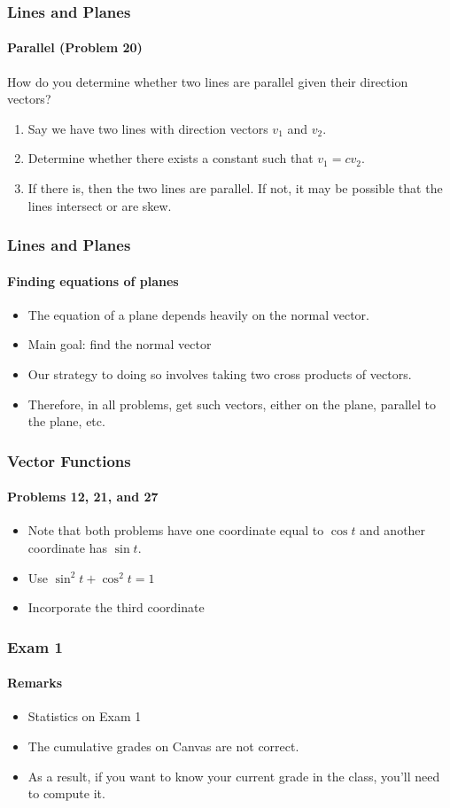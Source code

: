 \documentclass[xcolor=svgnames]{beamer}
\begin{document}
\begin{frame}
\frametitle{Lines and Planes}
\framesubtitle{Parallel (Problem 20)}
How do you determine whether two lines are parallel given their direction vectors? 
\begin{enumerate}
\item Say we have two lines with direction vectors $v_1$ and $v_2$. 
\item Determine whether there exists a constant such that $v_1 = c v_2$. 
\item If there is, then the two lines are parallel. If not, it may be possible that the lines intersect or are skew. 
\end{enumerate}


\end{frame}
\begin{frame}
\frametitle{Lines and Planes}
\framesubtitle{Finding equations of planes}
\begin{itemize}
	\item The equation of a plane depends heavily on the normal vector.
	\item Main goal: find the normal vector
	\item Our strategy to doing so involves taking two cross products of vectors.
	\item Therefore, in all problems, get such vectors, either on the plane, parallel to the plane, etc.
\end{itemize}
\end{frame}

\begin{frame}
\frametitle{Vector Functions}
\framesubtitle{Problems 12, 21, and 27}
\begin{itemize}
\item Note that both problems have one coordinate equal to $\cos t$ and another coordinate has $\sin t$. 
\item Use $\sin^2 t + \cos ^2 t = 1$ 
\item Incorporate the third coordinate
\end{itemize}
\end{frame}

\begin{frame}
\frametitle{Exam 1}
\framesubtitle{Remarks}
\begin{itemize}
\item Statistics on Exam 1
\item The cumulative grades on Canvas are not correct. 
\item As a result, if you want to know your current grade in the class, you'll need to compute it.
\end{itemize}
\end{frame}
\end{document}
